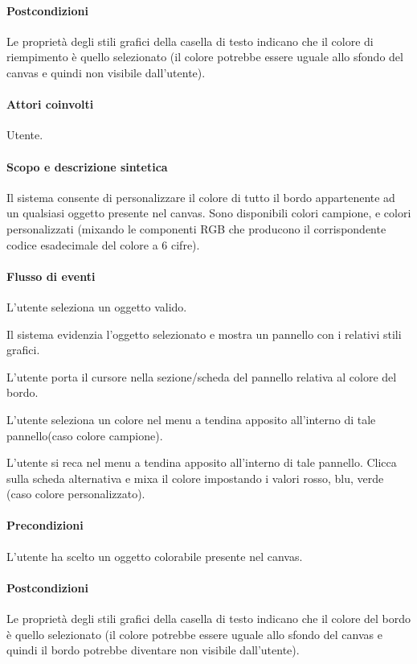 \paragraph{Postcondizioni}Le propriet\` a degli stili grafici della casella di testo indicano che il colore di riempimento \` e  quello selezionato (il colore potrebbe essere uguale allo sfondo del canvas e quindi non visibile dall'utente).


\paragraph{Attori coinvolti} Utente.
\paragraph{Scopo e descrizione sintetica} Il sistema consente di personalizzare il colore di tutto il bordo appartenente ad un qualsiasi oggetto presente nel canvas. Sono disponibili colori campione, e colori personalizzati (mixando le componenti RGB che producono il corrispondente codice esadecimale del colore a 6 cifre).
\paragraph{Flusso di eventi}
\begin{elenconumerato}[\textbf{}]{\subsubsecindent}
\item L'utente seleziona un oggetto valido.
\item Il sistema evidenzia l'oggetto selezionato e mostra un pannello con i relativi stili grafici.
\item L'utente  porta  il cursore nella sezione/scheda del pannello relativa al colore del bordo.
\item L'utente seleziona un colore  nel menu a tendina apposito all'interno di tale pannello(caso colore campione).
\item L'utente si reca nel menu a tendina apposito all'interno di tale pannello. Clicca sulla scheda alternativa e mixa il colore impostando i valori rosso, blu, verde (caso colore personalizzato).
\end{elenconumerato}
\paragraph{Precondizioni} L'utente ha scelto un oggetto colorabile presente nel canvas.
\paragraph{Postcondizioni} Le propriet\` a degli stili grafici della casella di testo indicano che il colore del bordo \`e quello selezionato (il colore potrebbe essere uguale allo sfondo del canvas e quindi il bordo potrebbe diventare non visibile dall'utente).


